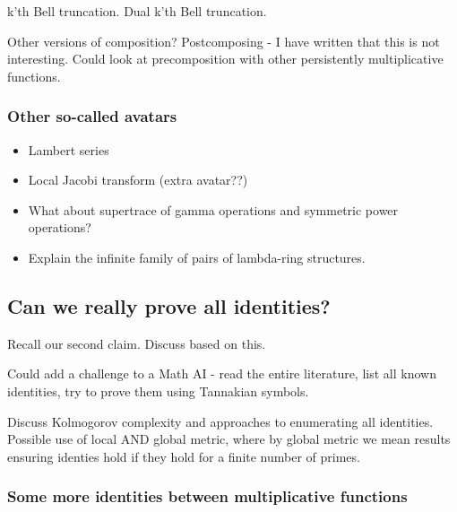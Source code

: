 \begin{propdef}
k'th Bell truncation. Dual k'th Bell truncation.
\end{propdef}


Other versions of composition? Postcomposing - I have written that this is not interesting. Could look at precomposition with other persistently multiplicative functions.

\subsubsection{Other so-called avatars}

\begin{itemize}

\item Lambert series
\item Local Jacobi transform (extra avatar??)
\item What about supertrace of gamma operations and symmetric power operations?
\item Explain the infinite family of pairs of lambda-ring structures.
\end{itemize}




\subsection{Can we really prove all identities?}

Recall our second claim. Discuss based on this.

Could add a challenge to a Math AI - read the entire literature, list all known identities, try to prove them using Tannakian symbols.

Discuss Kolmogorov complexity and approaches to enumerating all identities. Possible use of local AND global metric, where by global metric we mean results ensuring identies hold if they hold for a finite number of primes.

\subsubsection{Some more identities between multiplicative functions}

